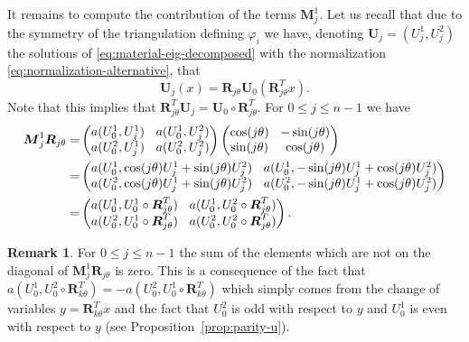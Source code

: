 \documentclass[JEP,XML,SOM,Unicode,ThmDefs,NoFloatCountersInSection,published]{cedram}
\newcommand{\colsep}{\arraycolsep4.5pt}
\theoremstyle{plain}
\theoremstyle{definition}
\newtheorem{rem}[thm]{Remark}
\newcommand{\bo}[1]{{\boldsymbol#1}}
\begin{document}
It remains to compute the contribution of the terms $\bo M_j^1$. Let us recall that due to the symmetry of the triangulation defining $\varphi_i$ we have, denoting $\bo U_j = (U_j^1,U_j^2)$ the solutions of \eqref{eq:material-eig-decomposed} with the normalization \eqref{eq:normalization-alternative}, that
\[
\bo U_j(x) = \bo R_{j\theta} \bo U_0(\bo R_{j\theta}^Tx).
\]
Note that this implies that $\bo R_{j\theta}^T \bo U_j = \bo U_0 \circ \bo R_{j\theta}^T$.
For $0\leq j \leq n-1$ we have\vspace*{-3pt}
\begin{align*}
\bo M_j^1 \bo R_{j\theta} = & \colsep\begin{pmatrix}
a(U_0^1,U_j^1) & a(U_0^1,U_j^2) \\
a(U_0^2,U_j^1) & a(U_0^2,U_j^2)
\end{pmatrix}
\begin{pmatrix}
\cos (j\theta) & -\sin(j\theta) \\
\sin(j\theta) & \cos(j\theta)
\end{pmatrix}\\
= &\colsep \begin{pmatrix}
a(U_0^1,\cos(j\theta)U_j^1+\sin(j\theta)U_j^2) & a(U_0^1,-\sin(j\theta)U_j^1+\cos(j\theta)U_j^2) \\
a(U_0^2,\cos(j\theta)U_j^1+\sin(j\theta)U_j^2) & a(U_0^2,-\sin(j\theta)U_j^1+\cos(j\theta)U_j^2)
\end{pmatrix} \\
= & \colsep\begin{pmatrix}
a(U_0^1,U_0^1\circ \bo R_{j\theta}^T) & a(U_0^1,U_0^2\circ \bo R_{j\theta}^T) \\
a(U_0^2,U_0^1\circ \bo R_{j\theta}^T) & a(U_0^2,U_0^2\circ \bo R_{j\theta}^T)
\end{pmatrix}.
\end{align*}

\begin{rem}
For $0\leq j \leq n-1$ the sum of the elements which are not on the diagonal of $\bo M_j^1 \bo R_{j\theta}$ is zero. This is a consequence of the fact that $a(U_0^1,U_0^2\circ\bo R_{k\theta}^T) = -a(U_0^2,U_0^1\circ\bo R_{k\theta}^T)$ which simply comes from the change of variables $y = \bo R_{k\theta}^Tx$ and the fact that $U_0^2$ is odd with respect to $y$ and $U_0^1$ is even with respect to $y$ (see Proposition~\ref{prop:parity-u}).
\label{rem:zerooffdiagsum-M1}
\end{rem}
\end{document}
